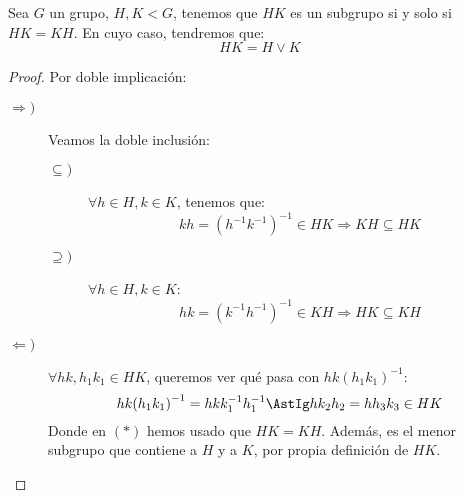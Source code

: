 \begin{prop}
    Sea $G$ un grupo, $H, K < G$, tenemos que $HK$ es un subgrupo si y solo si $HK = KH$. En cuyo caso, tendremos que:
    \begin{equation*}
        HK = H\lor K
    \end{equation*}
    \begin{proof}
        Por doble implicación:
        \begin{description}
            \item [$\Longrightarrow)$]   Veamos la doble inclusión:
                \begin{description}
                    \item [$\subseteq)$] $\forall h\in H, k\in K$, tenemos que:
                        \begin{equation*}
                            kh = {(h^{-1}k^{-1})}^{-1} \in HK \Longrightarrow KH \subseteq HK
                        \end{equation*}
                    \item [$\supseteq)$] $\forall h\in H, k\in K$: %
                        \begin{equation*}
                            hk = {(k^{-1}h^{-1})}^{-1} \in KH \Longrightarrow HK \subseteq KH
                        \end{equation*}
                \end{description}

            \item [$\Longleftarrow)$] $\forall hk, h_1k_1 \in HK$, queremos ver qué pasa con $hk{(h_1k_1)}^{-1}$:
                \begin{equation*}
                    hk{(h_1k_1)}^{-1} = hkk_1^{-1}h_1^{-1} \AstIg hk_2 h_2 = hh_3k_3 \in HK
                \end{equation*}
                Donde en $(\ast)$ hemos usado que $HK = KH$. Además, es el menor subgrupo que contiene a $H$ y a $K$, por propia definición de $HK$.
        \end{description}
    \end{proof}
\end{prop}

